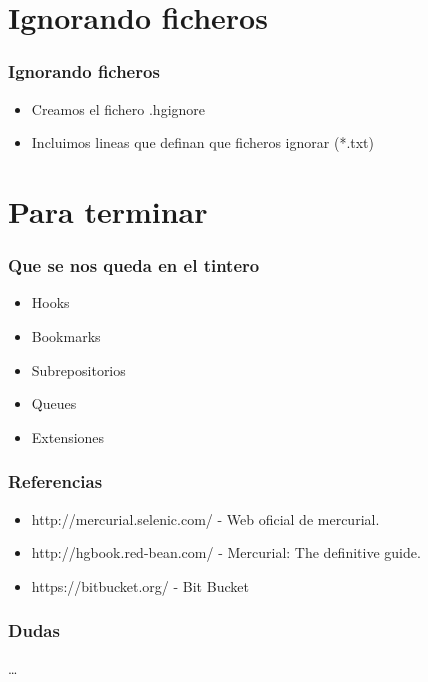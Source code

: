 \documentclass[10pt]{beamer}
\begin{document}
  \section*{Ignorando ficheros}

  \begin{frame}[containsverbatim]
    \frametitle{Ignorando ficheros}
    \begin{itemize}
      \item Creamos el fichero .hgignore
      \item Incluimos lineas que definan que ficheros ignorar (*.txt)
    \end{itemize}
  \end{frame}

  \section*{Para terminar}

  \begin{frame}
    \frametitle{Que se nos queda en el tintero}
    \begin{itemize}
      \item Hooks
      \item Bookmarks
      \item Subrepositorios
      \item Queues
      \item Extensiones
    \end{itemize}
  \end{frame}

  \begin{frame}
    \frametitle{Referencias}
    \begin{itemize}
      \item \small{http://mercurial.selenic.com/ - Web oficial de mercurial.}
      \item \small{http://hgbook.red-bean.com/ - Mercurial: The definitive guide.}
      \item \small{https://bitbucket.org/ - Bit Bucket}
    \end{itemize}
  \end{frame}

  \begin{frame}
    \frametitle{Dudas}
    \dots
  \end{frame}
\end{document}
